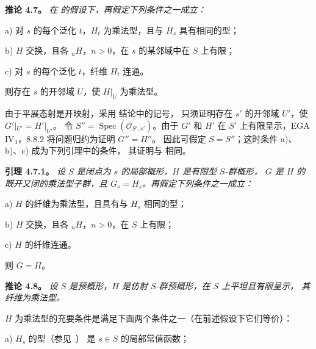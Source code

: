 \par\medskip\noindent
\textbf{推论 4.7。}\enspace
\begingroup\itshape
在  的假设下，再假定下列条件之一成立：

\smallskip
\noindent
a) 对 \(s\) 的每个泛化 \(t\)，\(H_t\) 为乘法型，且与 \(H_s\) 具有相同的型；

\smallskip
\noindent
b) \(H\) 交换，且各 \({}_nH\)，\(n>0\)，在 \(s\) 的某邻域中在 \(S\) 上有限；

\smallskip
\noindent
c) 对 \(s\) 的每个泛化 \(t\)，纤维 \(H_t\) 连通。

\smallskip
则存在 \(s\) 的开邻域 \(U\)，使 \(H|_U\) 为乘法型。
\par\endgroup

由于平展态射是开映射，采用  结论中的记号，
只须证明存在 \(s'\) 的开邻域 \(U'\)，使 \(G'|_{U'}=H'|_{U'}\)。
令 \(S''=\operatorname{Spec}(\mathcal O_{S',s'})\)。由于 \(G'\) 和 \(H'\)
在 \(S'\) 上有限呈示，EGA IV\(_3\)，8.8.2 将问题归约为证明 \(G''=H''\)。
因此可假定 \(S=S''\)；这时条件 a)、b)、c) 成为下列引理中的条件，
其证明与  相同。

\par\medskip\noindent
\textbf{引理 4.7.1。}\enspace
\begingroup\itshape
设 \(S\) 是闭点为 \(s\) 的局部概形，\(H\) 是有限型 \(S\)-群概形，
\(G\) 是 \(H\) 的既开又闭的乘法型子群，且 \(G_s=H_s\)。再假定下列条件之一成立：

\smallskip
\noindent
a) \(H\) 的纤维为乘法型，且具有与 \(H_s\) 相同的型；

\smallskip
\noindent
b) \(H\) 交换，且各 \({}_nH\)，\(n>0\)，在 \(S\) 上有限；

\smallskip
\noindent
c) \(H\) 的纤维连通。

\smallskip
则 \(G=H\)。
\par\endgroup

\par\medskip\noindent
\textbf{推论 4.8。}\enspace
\begingroup\itshape
设 \(S\) 是预概形，\(H\) 是仿射 \(S\)-群预概形，在 \(S\) 上平坦且有限呈示，
其纤维为乘法型。

\(H\) 为乘法型的充要条件是满足下面两个条件之一（在前述假设下它们等价）：

\smallskip
\noindent
{}a) \(H_s\) 的型（参见\ ）
是 \(s\in S\) 的局部常值函数；

